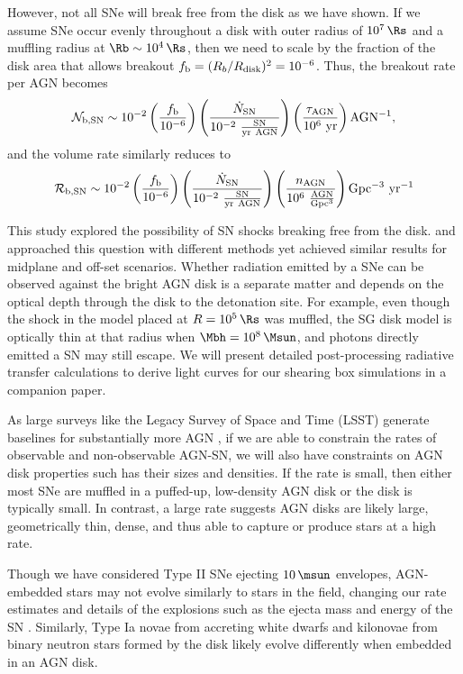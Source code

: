 However, not all SNe will break free from the disk as we have shown.
If we assume SNe occur evenly throughout a disk with outer radius of $10^7\,\Rs$ and a muffling radius at $\Rb\sim10^4\,\Rs$, then we need to scale by the fraction of the disk area that allows breakout $f_{\rm b} = (R_b / R_{\rm disk})^{2} = 10^{-6}$.
Thus, the breakout rate per AGN becomes
\begin{equation}
    \mathcal{N_{\rm b,SN}} \sim 10^{-2} \left( \frac{f_{\rm b}}{10^{-6}} \right) \left( \frac{\dot{N}_{\rm SN}}{\rm 10^{-2}\ \frac{SN}{yr\ AGN}} \right) \left( \frac{\tau_{\rm AGN}}{\rm 10^6\ yr} \right) \mathrm{AGN^{-1}},
\end{equation}
and the volume rate similarly reduces to
\begin{equation}
    \mathcal{R_{\rm b,SN}} \sim 10^{-2} \left( \frac{f_{\rm b}}{10^{-6}} \right) \left( \frac{\dot{N}_{\rm SN}}{\rm 10^{-2}\ \frac{SN}{yr\ AGN}} \right) \left( \frac{n_{\rm AGN}}{\rm 10^6\ \frac{AGN}{Gpc^3}} \right) \mathrm{Gpc^{-3}\ yr^{-1}}
\end{equation}

This study explored the possibility of SN shocks breaking free from the disk.
\citet{Moranchel+21} and \citet{Grishin+21} approached this question with different methods yet achieved similar results for midplane and off-set scenarios.
Whether radiation emitted by a SNe can be observed against the bright AGN disk is a separate matter and depends on the optical depth through the disk to the detonation site.
For example, even though the shock in the model placed at $R=10^5\,\Rs$ was muffled, the SG disk model is optically thin at that radius when $\Mbh=10^8\,\Msun$, and photons directly emitted a SN may still escape.
We will present detailed post-processing radiative transfer calculations to derive light curves for our shearing box simulations in a companion paper.

As large surveys like the Legacy Survey of Space and Time (LSST) generate baselines for substantially more AGN \citep{Kovacevic+22}, if we are able to constrain the rates of observable and non-observable AGN-SN, we will also have constraints on AGN disk properties such has their sizes and densities.
If the rate is small, then either most SNe are muffled in a puffed-up, low-density AGN disk or the disk is typically small.
In contrast, a large rate suggests AGN disks are likely large, geometrically thin, dense, and thus able to capture or produce stars at a high rate.

Though we have considered Type II SNe ejecting $10\,\msun$ envelopes, AGN-embedded stars may not evolve similarly to stars in the field, changing our rate estimates and details of the explosions such as the ejecta mass and energy of the SN \citep{CantielloJermynLin21, DittmannJermynCantiello23}.
Similarly, Type Ia novae from accreting white dwarfs and kilonovae from binary neutron stars formed by the disk likely evolve differently when embedded in an AGN disk.


